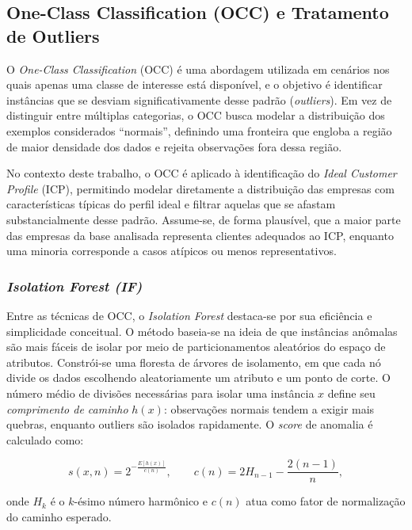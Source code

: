 \subsection{One-Class Classification (OCC) e Tratamento de Outliers}

O \textit{One-Class Classification} (OCC) é uma abordagem utilizada em cenários
nos quais apenas uma classe de interesse está disponível, e o objetivo é
identificar instâncias que se desviam significativamente desse padrão
(\textit{outliers}). Em vez de distinguir entre múltiplas categorias,
o OCC busca modelar a distribuição dos exemplos considerados ``normais'',
definindo uma fronteira que engloba a região de maior densidade dos dados
e rejeita observações fora dessa região. 

No contexto deste trabalho, o OCC é aplicado à identificação do
\textit{Ideal Customer Profile} (ICP), permitindo modelar diretamente a
distribuição das empresas com características típicas do perfil ideal e
filtrar aquelas que se afastam substancialmente desse padrão. Assume-se,
de forma plausível, que a maior parte das empresas da base analisada
representa clientes adequados ao ICP, enquanto uma minoria corresponde a
casos atípicos ou menos representativos.

\subsubsection{\textit{Isolation Forest (IF)}}

Entre as técnicas de OCC, o \textit{Isolation Forest} destaca-se por sua
eficiência e simplicidade conceitual. O método baseia-se na ideia de que
instâncias anômalas são mais fáceis de isolar por meio de particionamentos
aleatórios do espaço de atributos. Constrói-se uma floresta de árvores de
isolamento, em que cada nó divide os dados escolhendo aleatoriamente um
atributo e um ponto de corte. O número médio de divisões necessárias para
isolar uma instância $x$ define seu \textit{comprimento de caminho}
$h(x)$: observações normais tendem a exigir mais quebras, enquanto
outliers são isolados rapidamente. O \textit{score} de anomalia é
calculado como:

\begin{equation}
s(x, n) = 2^{-\frac{E[h(x)]}{c(n)}}, \qquad
c(n) = 2H_{n-1} - \frac{2(n - 1)}{n},
\end{equation}

onde $H_k$ é o $k$-ésimo número harmônico e $c(n)$ atua como fator de
normalização do caminho esperado.

